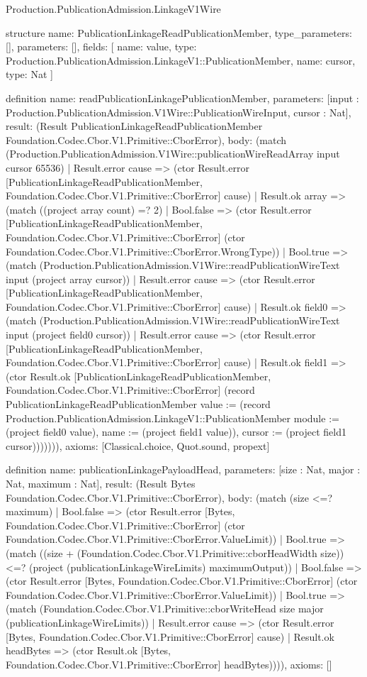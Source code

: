 \begin{lexlean}{Production.PublicationAdmission.LinkageV1Wire}
\begin{semanticmodule}
structure{
  name: PublicationLinkageReadPublicationMember,
  type_parameters: [],
  parameters: [],
  fields: [
    {name: value, type: Production.PublicationAdmission.LinkageV1::PublicationMember},
    {name: cursor, type: Nat}
  ]
}

definition{
  name: readPublicationLinkagePublicationMember,
  parameters: [input : Production.PublicationAdmission.V1Wire::PublicationWireInput, cursor : Nat],
  result: (Result PublicationLinkageReadPublicationMember Foundation.Codec.Cbor.V1.Primitive::CborError),
  body: (match (Production.PublicationAdmission.V1Wire::publicationWireReadArray input cursor 65536)
    | Result.error cause => (ctor Result.error [PublicationLinkageReadPublicationMember, Foundation.Codec.Cbor.V1.Primitive::CborError] cause)
    | Result.ok array => (match ((project array count) =? 2)
      | Bool.false => (ctor Result.error [PublicationLinkageReadPublicationMember, Foundation.Codec.Cbor.V1.Primitive::CborError] (ctor Foundation.Codec.Cbor.V1.Primitive::CborError.WrongType))
      | Bool.true => (match (Production.PublicationAdmission.V1Wire::readPublicationWireText input (project array cursor))
        | Result.error cause => (ctor Result.error [PublicationLinkageReadPublicationMember, Foundation.Codec.Cbor.V1.Primitive::CborError] cause)
        | Result.ok field0 => (match (Production.PublicationAdmission.V1Wire::readPublicationWireText input (project field0 cursor))
          | Result.error cause => (ctor Result.error [PublicationLinkageReadPublicationMember, Foundation.Codec.Cbor.V1.Primitive::CborError] cause)
          | Result.ok field1 => (ctor Result.ok [PublicationLinkageReadPublicationMember, Foundation.Codec.Cbor.V1.Primitive::CborError] (record PublicationLinkageReadPublicationMember {value := (record Production.PublicationAdmission.LinkageV1::PublicationMember {module := (project field0 value), name := (project field1 value)}), cursor := (project field1 cursor)})))))),
  axioms: [Classical.choice, Quot.sound, propext]
}

definition{
  name: publicationLinkagePayloadHead,
  parameters: [size : Nat, major : Nat, maximum : Nat],
  result: (Result Bytes Foundation.Codec.Cbor.V1.Primitive::CborError),
  body: (match (size <=? maximum)
    | Bool.false => (ctor Result.error [Bytes, Foundation.Codec.Cbor.V1.Primitive::CborError] (ctor Foundation.Codec.Cbor.V1.Primitive::CborError.ValueLimit))
    | Bool.true => (match ((size + (Foundation.Codec.Cbor.V1.Primitive::cborHeadWidth size)) <=? (project (publicationLinkageWireLimits) maximumOutput))
      | Bool.false => (ctor Result.error [Bytes, Foundation.Codec.Cbor.V1.Primitive::CborError] (ctor Foundation.Codec.Cbor.V1.Primitive::CborError.ValueLimit))
      | Bool.true => (match (Foundation.Codec.Cbor.V1.Primitive::cborWriteHead size major (publicationLinkageWireLimits))
        | Result.error cause => (ctor Result.error [Bytes, Foundation.Codec.Cbor.V1.Primitive::CborError] cause)
        | Result.ok headBytes => (ctor Result.ok [Bytes, Foundation.Codec.Cbor.V1.Primitive::CborError] headBytes)))),
  axioms: []
}


\end{semanticmodule}
\end{lexlean}
